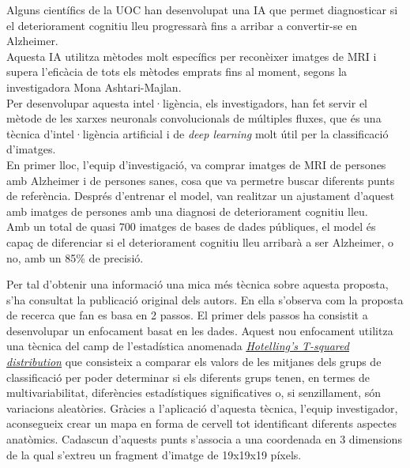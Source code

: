 \documentclass[a4paper,12pt]{report}
\begin{document}
\begin{center}
    \begin{minipage}{0.9\linewidth}
        \vspace{5pt}
        {\small
            Alguns científics de la UOC han desenvolupat una IA que permet diagnosticar si el deteriorament cognitiu lleu progressarà fins a arribar a convertir-se en Alzheimer.\\
            Aquesta IA utilitza mètodes molt específics per reconèixer imatges de MRI i supera l'eficàcia de tots els mètodes emprats fins al moment, segons la investigadora Mona Ashtari-Majlan.\\
            Per desenvolupar aquesta intel·ligència, els investigadors, han fet servir el mètode de les xarxes neuronals convolucionals de múltiples fluxes, que és una tècnica d'intel·ligència artificial i de \textit{deep learning} molt útil per la classificació d'imatges.\\
            En primer lloc, l'equip d'investigació, va comprar imatges de MRI de persones amb Alzheimer i de persones sanes, cosa que va permetre buscar diferents punts de referència. Després d'entrenar el model, van realitzar un ajustament d'aquest amb imatges de persones amb una diagnosi de deteriorament cognitiu lleu.\\
            Amb un total de quasi 700 imatges de bases de dades públiques, el model és capaç de diferenciar si el deteriorament cognitiu lleu arribarà a ser Alzheimer, o no, amb un 85\% de precisió.
        }
        \vspace{5pt}
    \end{minipage}
\end{center}
Per tal d'obtenir una informació una mica més tècnica sobre aquesta proposta, s'ha consultat la publicació original dels autors. En ella s'observa com la proposta de recerca que fan es basa en 2 passos. El primer dels passos ha consistit a desenvolupar un enfocament basat en les dades. Aquest nou enfocament utilitza una tècnica del camp de l'estadística anomenada \textit{\href{https://www.statisticshowto.com/hotellings-t-squared/}{\underline{Hotelling's T-squared distribution}}} que consisteix a comparar els valors de les mitjanes dels grups de classificació per poder determinar si els diferents grups tenen, en termes de multivariabilitat, diferències estadístiques significatives o, si senzillament, són variacions aleatòries. Gràcies a l'aplicació d'aquesta tècnica, l'equip investigador, aconsegueix crear un mapa en forma de cervell tot identificant diferents aspectes anatòmics. Cadascun d'aquests punts s'associa a una coordenada en 3 dimensions de la qual s'extreu un fragment d'imatge de 19x19x19 píxels.\\
\end{document}
